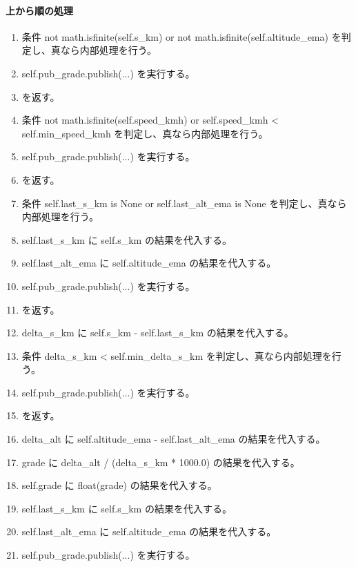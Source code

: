 \documentclass[a4paper,11pt]{article}
\begin{document}
            \paragraph{上から順の処理}
            \begin{enumerate}[leftmargin=1.8em]
            \item 条件 not math.isfinite(self.s\_km) or not math.isfinite(self.altitude\_ema) を判定し、真なら内部処理を行う。
\item   self.pub\_grade.publish(...) を実行する。
\item    を返す。
\item 条件 not math.isfinite(self.speed\_kmh) or self.speed\_kmh < self.min\_speed\_kmh を判定し、真なら内部処理を行う。
\item   self.pub\_grade.publish(...) を実行する。
\item    を返す。
\item 条件 self.last\_s\_km is None or self.last\_alt\_ema is None を判定し、真なら内部処理を行う。
\item   self.last\_s\_km に self.s\_km の結果を代入する。
\item   self.last\_alt\_ema に self.altitude\_ema の結果を代入する。
\item   self.pub\_grade.publish(...) を実行する。
\item    を返す。
\item delta\_s\_km に self.s\_km - self.last\_s\_km の結果を代入する。
\item 条件 delta\_s\_km < self.min\_delta\_s\_km を判定し、真なら内部処理を行う。
\item   self.pub\_grade.publish(...) を実行する。
\item    を返す。
\item delta\_alt に self.altitude\_ema - self.last\_alt\_ema の結果を代入する。
\item grade に delta\_alt / (delta\_s\_km * 1000.0) の結果を代入する。
\item self.grade に float(grade) の結果を代入する。
\item self.last\_s\_km に self.s\_km の結果を代入する。
\item self.last\_alt\_ema に self.altitude\_ema の結果を代入する。
\item self.pub\_grade.publish(...) を実行する。
            \end{enumerate}
\end{document}
